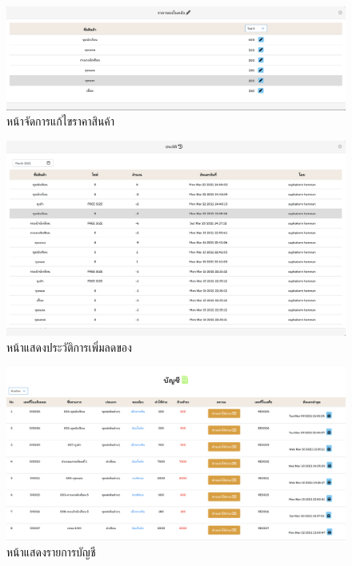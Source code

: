       \begin{figure}
        \begin{center}
        \includegraphics[width=\linewidth]{images/editPrice.png}
        \end{center}
        \caption[หน้าจัดการแก้ไขราคาสินค้า]{หน้าจัดการแก้ไขราคาสินค้า}
        \label{fig:editPrice}
        \end{figure}
    
    
      \begin{figure}
        \begin{center}
        \includegraphics[width=\linewidth]{images/historyStock.png}
        \end{center}
        \caption[หน้าแสดงประวัติการเพิ่มลดของ]{หน้าแสดงประวัติการเพิ่มลดของ}
        \label{fig:HistoryStock}
      \end{figure}
      \begin{figure}
        \begin{center}
        \includegraphics[width=\linewidth]{images/Payment.png}
        \end{center}
        \caption[หน้าแสดงรายการบัญชี]{หน้าแสดงรายการบัญชี}
        \label{fig:Payment}
      
        \end{figure}
    
